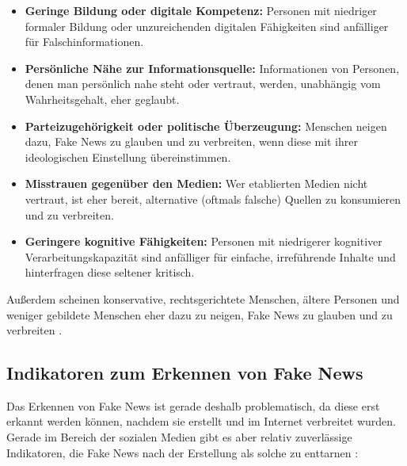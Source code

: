\begin{itemize}
    \item \textbf{Geringe Bildung oder digitale Kompetenz:} Personen mit niedriger formaler Bildung oder unzureichenden digitalen Fähigkeiten sind anfälliger für Falschinformationen.
    
    \item \textbf{Persönliche Nähe zur Informationsquelle:} Informationen von Personen, denen man persönlich nahe steht oder vertraut, werden, unabhängig vom Wahrheitsgehalt, eher geglaubt.
    
    \item \textbf{Parteizugehörigkeit oder politische Überzeugung:} Menschen neigen dazu, Fake News zu glauben und zu verbreiten, wenn diese mit ihrer ideologischen Einstellung übereinstimmen.
    
    \item \textbf{Misstrauen gegenüber den Medien:} Wer etablierten Medien nicht vertraut, ist eher bereit, alternative (oftmals falsche) Quellen zu konsumieren und zu verbreiten.
    
    \item \textbf{Geringere kognitive Fähigkeiten:} Personen mit niedrigerer kognitiver Verarbeitungskapazität sind anfälliger für einfache, irreführende Inhalte und hinterfragen diese seltener kritisch.
\end{itemize}

Außerdem scheinen konservative, rechtsgerichtete Menschen, ältere Personen und weniger gebildete Menschen eher dazu zu neigen, Fake News zu glauben und zu verbreiten \cite{socsci9100185}.

\subsection{Indikatoren zum Erkennen von Fake News}
\label{sec:potenzielle_indikatoren}

Das Erkennen von Fake News ist gerade deshalb problematisch, da diese erst erkannt werden können, nachdem sie erstellt und im Internet verbreitet wurden. \cite{Sharma:2024}
Gerade im Bereich der sozialen Medien gibt es aber relativ zuverlässige Indikatoren, die Fake News nach der Erstellung als solche zu enttarnen \cite{Hartwig2021}:

